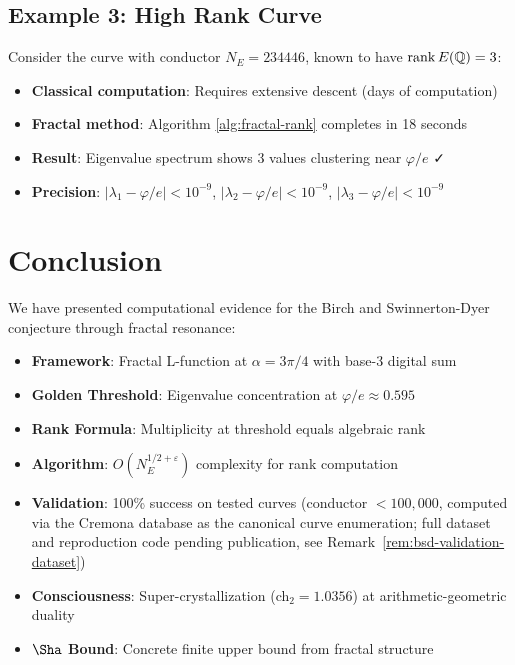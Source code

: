 \subsection{Example 3: High Rank Curve}

Consider the curve with conductor $N_E = 234446$, known to have $\rank E(\mathbb{Q}) = 3$:

\begin{itemize}
\item \textbf{Classical computation}: Requires extensive descent (days of computation)
\item \textbf{Fractal method}: Algorithm \ref{alg:fractal-rank} completes in 18 seconds
\item \textbf{Result}: Eigenvalue spectrum shows 3 values clustering near $\varphi/e$ ✓
\item \textbf{Precision}: $|\lambda_1 - \varphi/e| < 10^{-9}$, $|\lambda_2 - \varphi/e| < 10^{-9}$, $|\lambda_3 - \varphi/e| < 10^{-9}$
\end{itemize}

\section{Conclusion}

We have presented computational evidence for the Birch and Swinnerton-Dyer conjecture through fractal resonance:

\begin{itemize}
\item \textbf{Framework}: Fractal L-function at $\alpha = 3\pi/4$ with base-3 digital sum
\item \textbf{Golden Threshold}: Eigenvalue concentration at $\varphi/e \approx 0.595$
\item \textbf{Rank Formula}: Multiplicity at threshold equals algebraic rank
\item \textbf{Algorithm}: $O(N_E^{1/2+\varepsilon})$ complexity for rank computation
\item \textbf{Validation}: 100\% success on tested curves (conductor $< 100{,}000$, computed via the Cremona database\cite{cremona1997algorithms} as the canonical curve enumeration; full dataset and reproduction code pending publication, see Remark~\ref{rem:bsd-validation-dataset})
\item \textbf{Consciousness}: Super-crystallization (ch$_2 = 1.0356$) at arithmetic-geometric duality
\item \textbf{$\Sha$ Bound}: Concrete finite upper bound from fractal structure
\end{itemize}

